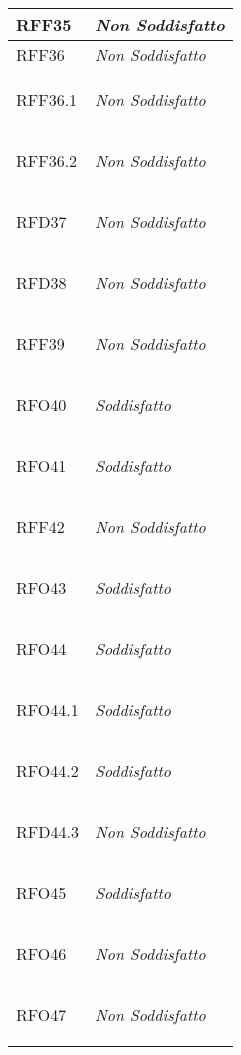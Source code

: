 \begin{longtable}{|>{\centering}m{5cm}|m{5cm}<{\centering}|}
    \hypertarget{RFF35}{RFF35} & \textit{Non Soddisfatto}\\ \hline
   
    \hypertarget{RFF36}{RFF36} & \textit{Non Soddisfatto}\\ \hline
   
    \hypertarget{RFF36.1}{RFF36.1} & \textit{Non Soddisfatto}\\ \hline
   
    \hypertarget{RFF36.2}{RFF36.2} & \textit{Non Soddisfatto}\\ \hline
   
    \hypertarget{RFD37}{RFD37} & \textit{Non Soddisfatto}\\ \hline
   
    \hypertarget{RFD38}{RFD38} & \textit{Non Soddisfatto}\\ \hline
   
    \hypertarget{RFF39}{RFF39} & \textit{Non Soddisfatto}\\ \hline
   
    \hypertarget{RFO40}{RFO40} & \textit{Soddisfatto}\\ \hline
   
    \hypertarget{RFO41}{RFO41} & \textit{Soddisfatto}\\ \hline
   
    \hypertarget{RFF42}{RFF42} & \textit{Non Soddisfatto}\\ \hline
   
    \hypertarget{RFO43}{RFO43} & \textit{Soddisfatto}\\ \hline
   
    \hypertarget{RFO44}{RFO44} & \textit{Soddisfatto}\\ \hline
   
    \hypertarget{RFO44.1}{RFO44.1} & \textit{Soddisfatto}\\ \hline
   
    \hypertarget{RFO44.2}{RFO44.2} & \textit{Soddisfatto}\\ \hline
   
    \hypertarget{RFD44.3}{RFD44.3} & \textit{Non Soddisfatto}\\ \hline
   
    \hypertarget{RFO45}{RFO45} & \textit{Soddisfatto}\\ \hline
   
    \hypertarget{RFO46}{RFO46} & \textit{Non Soddisfatto}\\ \hline
   
    \hypertarget{RFO47}{RFO47} & \textit{Non Soddisfatto}\\ \hline
   

\end{longtable}

